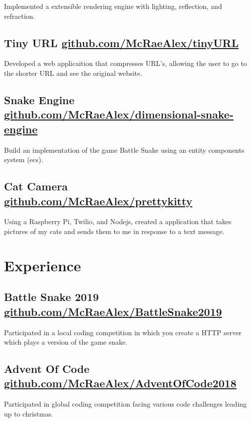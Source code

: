 \documentclass{article}
\begin{document}
Implemented a extensible rendering engine with lighting, reflection, and 
refraction.

\subsection{Tiny URL \href{github.com/McRaeAlex/tinyURL}{github.com/McRaeAlex/tinyURL}}

Developed a web applicaition that compresses URL's, allowing the user to go to 
the shorter URL and see the original website.

\subsection{Snake Engine \href{github.com/McRaeAlex/dimensional-snake-engine}{github.com/McRaeAlex/dimensional-snake-engine}}

Build an implementation of the game Battle Snake using an entity components
system (ecs).

\subsection{Cat Camera \href{github.com/McRaeAlex/prettykitty}{github.com/McRaeAlex/prettykitty}}

Using a Raspberry Pi, Twilio, and Nodejs, created a application that takes 
pictures of my cats and sends them to me in response to a text message.

\section{Experience}

\subsection{Battle Snake 2019 \href{github.com/McRaeAlex/BattleSnake2019}{github.com/McRaeAlex/BattleSnake2019}}

Participated in a local coding competition in which you create a HTTP server
which plays a version of the game snake.

\subsection{Advent Of Code \href{github.com/McRaeAlex/AdventOfCode2018}{github.com/McRaeAlex/AdventOfCode2018}}

Participated in global coding competition facing various code challenges leading
up to christmas.
\end{document}
